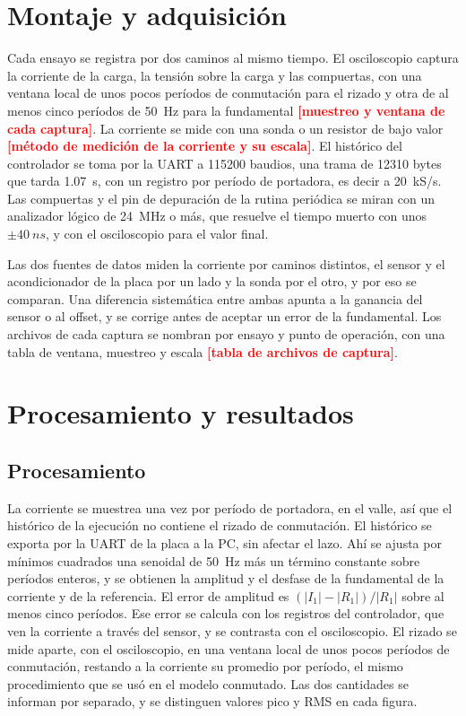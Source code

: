 \documentclass[journal]{IEEEtran}
\newcommand{\pendiente}[1]{\textcolor{red}{\textbf{[#1]}}}
\begin{document}
\section{Montaje y adquisición}
\label{sec:montaje}
Cada ensayo se registra por dos caminos al mismo tiempo. El osciloscopio captura la corriente de la carga, la tensión sobre la carga y las compuertas, con una ventana local de unos pocos períodos de conmutación para el rizado y otra de al menos cinco períodos de \SI{50}{Hz} para la fundamental \pendiente{muestreo y ventana de cada captura}. La corriente se mide con una sonda o un resistor de bajo valor \pendiente{método de medición de la corriente y su escala}. El histórico del controlador se toma por la UART a \num{115200} baudios, una trama de \num{12310} bytes que tarda \SI{1.07}{s}, con un registro por período de portadora, es decir a \SI{20}{kS/s}. Las compuertas y el pin de depuración de la rutina periódica se miran con un analizador lógico de \SI{24}{MHz} o más, que resuelve el tiempo muerto con unos $\pm\SI{40}{ns}$, y con el osciloscopio para el valor final.

Las dos fuentes de datos miden la corriente por caminos distintos, el sensor y el acondicionador de la placa por un lado y la sonda por el otro, y por eso se comparan. Una diferencia sistemática entre ambas apunta a la ganancia del sensor o al offset, y se corrige antes de aceptar un error de la fundamental. Los archivos de cada captura se nombran por ensayo y punto de operación, con una tabla de ventana, muestreo y escala \pendiente{tabla de archivos de captura}.

\section{Procesamiento y resultados}
\label{sec:resultados}
\subsection{Procesamiento}
\label{sec:proc}
La corriente se muestrea una vez por período de portadora, en el valle, así que el histórico de la ejecución no contiene el rizado de conmutación. El histórico se exporta por la UART de la placa a la PC, sin afectar el lazo. Ahí se ajusta por mínimos cuadrados una senoidal de \SI{50}{Hz} más un término constante sobre períodos enteros, y se obtienen la amplitud y el desfase de la fundamental de la corriente y de la referencia. El error de amplitud es $(|I_1|-|R_1|)/|R_1|$ sobre al menos cinco períodos. Ese error se calcula con los registros del controlador, que ven la corriente a través del sensor, y se contrasta con el osciloscopio. El rizado se mide aparte, con el osciloscopio, en una ventana local de unos pocos períodos de conmutación, restando a la corriente su promedio por período, el mismo procedimiento que se usó en el modelo conmutado. Las dos cantidades se informan por separado, y se distinguen valores pico y RMS en cada figura.
\end{document}
